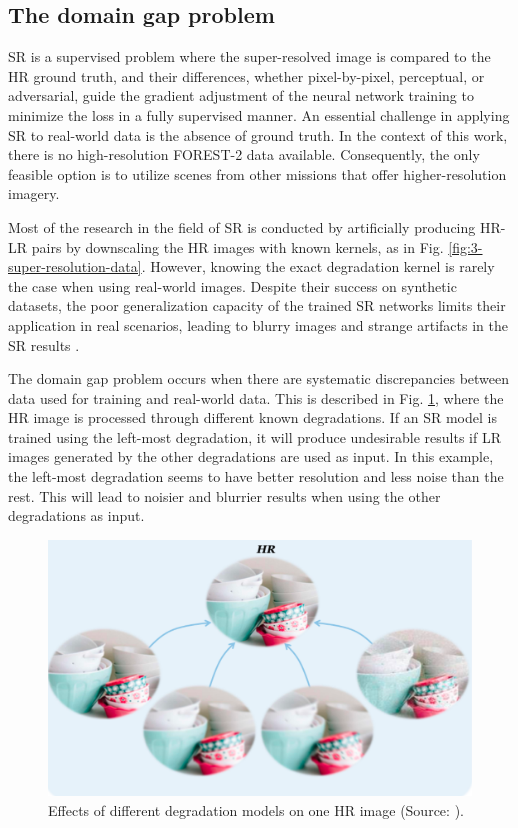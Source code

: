     \subsection{The domain gap problem} \label{subsec:domaingap}
 
        SR is a supervised problem where the super-resolved image is compared to the HR ground truth, and their differences, whether pixel-by-pixel, perceptual, or adversarial, guide the gradient adjustment of the neural network training to minimize the loss in a fully supervised manner. 
        An essential challenge in applying SR to real-world data is the absence of ground truth. In the context of this work, there is no high-resolution FOREST-2 data available. Consequently, the only feasible option is to utilize scenes from other missions that offer higher-resolution imagery.

        Most of the research in the field of SR is conducted by artificially producing HR-LR pairs by downscaling the HR images with known kernels, as in Fig. \ref{fig:3-super-resolution-data}.
        However, knowing the exact degradation kernel is rarely the case when using real-world images.
        Despite their success on synthetic datasets, the poor generalization capacity of the trained SR networks limits their application in real scenarios, leading to blurry images and strange artifacts in the SR results \cite{lugmayr2020ntire}.

        The domain gap problem occurs when there are systematic discrepancies between data used for training and real-world data. 
        This is described in Fig. \ref{fig:2-domain-gap}, where the HR image is processed through different known degradations. 
        If an SR model is trained using the left-most degradation, it will produce undesirable results if LR images generated by the other degradations are used as input.
        In this example, the left-most degradation seems to have better resolution and less noise than the rest. This will lead to noisier and blurrier results when using the other degradations as input.

        \begin{figure}[H]
            \centering
            \includegraphics[scale=0.4]{Includes/2-domain-gap.pdf}
            \caption{Effects of different degradation models on one HR image (Source: \cite{liu2021blind}).}
            \label{fig:2-domain-gap}
        \end{figure}

